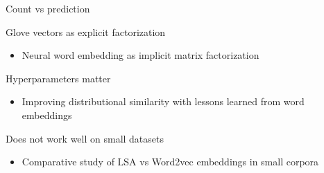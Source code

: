 \documentclass[xcolor={table}]{beamer}
\begin{document}
\begin{frame}{Count vs prediction}
    \begin{block}{Glove vectors as explicit factorization}
        \begin{itemize}
            \item Neural word embedding as implicit matrix factorization \cite{levy2014neural}
        \end{itemize}
    \end{block}

    \begin{block}{Hyperparameters matter}
        \begin{itemize}
            \item Improving distributional similarity with lessons learned from word embeddings \cite{levy2015improving}
        \end{itemize}
    \end{block}

    \begin{block}{Does not work well on small datasets}
        \begin{itemize}
            \item Comparative study of LSA vs Word2vec embeddings in small corpora \cite{altszyler2016comparative}
        \end{itemize}
    \end{block}
\end{frame} 
\end{document}
